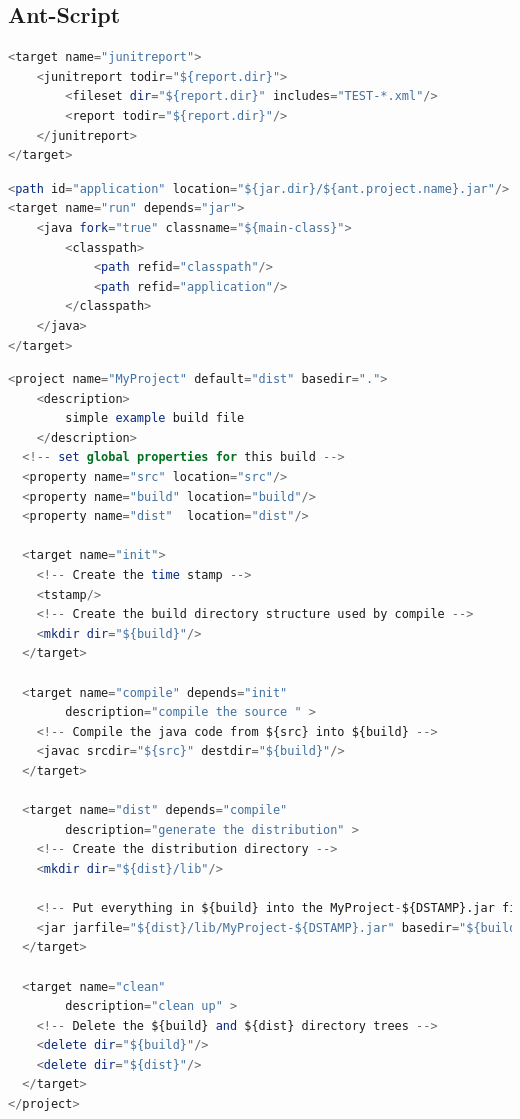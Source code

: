 \documentclass[a4paper,10pt]{article}
\begin{document}
\subsection{Ant-Script}

\begin{lstlisting}[language=Octave, label=Ant script, caption=Ant Script 2a, style=MyAntStyle]
<target name="junitreport">
    <junitreport todir="${report.dir}">
        <fileset dir="${report.dir}" includes="TEST-*.xml"/>
        <report todir="${report.dir}"/>
    </junitreport>
</target>
\end{lstlisting}
\begin{lstlisting}[language=Octave, label=Ant script, caption=Ant Script 2b, style=MyAntStyle]
<path id="application" location="${jar.dir}/${ant.project.name}.jar"/>
<target name="run" depends="jar">
    <java fork="true" classname="${main-class}">
        <classpath>
            <path refid="classpath"/>
            <path refid="application"/>
        </classpath>
    </java>
</target>
\end{lstlisting}
\begin{lstlisting}[language=Octave, label=Ant script, caption=Ant Script 2c, style=MyAntStyle]
 <project name="MyProject" default="dist" basedir=".">
    <description>
        simple example build file
    </description>
  <!-- set global properties for this build -->
  <property name="src" location="src"/>
  <property name="build" location="build"/>
  <property name="dist"  location="dist"/>

  <target name="init">
    <!-- Create the time stamp -->
    <tstamp/>
    <!-- Create the build directory structure used by compile -->
    <mkdir dir="${build}"/>
  </target>

  <target name="compile" depends="init"
        description="compile the source " >
    <!-- Compile the java code from ${src} into ${build} -->
    <javac srcdir="${src}" destdir="${build}"/>
  </target>

  <target name="dist" depends="compile"
        description="generate the distribution" >
    <!-- Create the distribution directory -->
    <mkdir dir="${dist}/lib"/>

    <!-- Put everything in ${build} into the MyProject-${DSTAMP}.jar file -->
    <jar jarfile="${dist}/lib/MyProject-${DSTAMP}.jar" basedir="${build}"/>
  </target>

  <target name="clean"
        description="clean up" >
    <!-- Delete the ${build} and ${dist} directory trees -->
    <delete dir="${build}"/>
    <delete dir="${dist}"/>
  </target>
</project>
\end{lstlisting}
\end{document}
